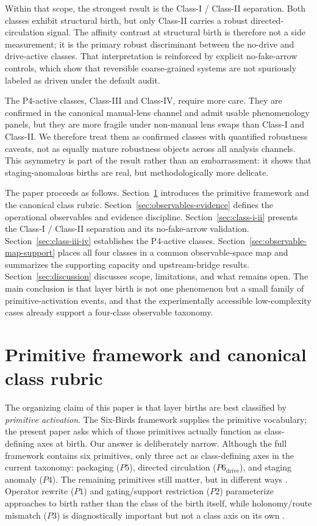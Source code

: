 \documentclass[11pt]{article}
\begin{document}
Within that scope, the strongest result is the Class-I / Class-II separation. Both classes exhibit structural birth, but only Class-II carries a robust directed-circulation signal. The affinity contrast at structural birth is therefore not a side measurement; it is the primary robust discriminant between the no-drive and drive-active classes. That interpretation is reinforced by explicit no-fake-arrow controls, which show that reversible coarse-grained systems are not spuriously labeled as driven under the default audit.

The P4-active classes, Class-III and Class-IV, require more care. They are confirmed in the canonical manual-lens channel and admit usable phenomenology panels, but they are more fragile under non-manual lens swaps than Class-I and Class-II. We therefore treat them as confirmed classes with quantified robustness caveats, not as equally mature robustness objects across all analysis channels. This asymmetry is part of the result rather than an embarrassment: it shows that staging-anomalous births are real, but methodologically more delicate.

The paper proceeds as follows. Section~\ref{sec:primitives-rubric} introduces the primitive framework and the canonical class rubric. Section~\ref{sec:observables-evidence} defines the operational observables and evidence discipline. Section~\ref{sec:class-i-ii} presents the Class-I / Class-II separation and its no-fake-arrow validation. Section~\ref{sec:class-iii-iv} establishes the P4-active classes. Section~\ref{sec:observable-map-support} places all four classes in a common observable-space map and summarizes the supporting capacity and upstream-bridge results. Section~\ref{sec:discussion} discusses scope, limitations, and what remains open. The main conclusion is that layer birth is not one phenomenon but a small family of primitive-activation events, and that the experimentally accessible low-complexity cases already support a four-class observable taxonomy.
 \section{Primitive framework and canonical class rubric}
\label{sec:primitives-rubric}

The organizing claim of this paper is that layer births are best classified by \emph{primitive activation}. The Six-Birds framework supplies the primitive vocabulary; the present paper asks which of those primitives actually function as class-defining axes at birth. Our answer is deliberately narrow. Although the full framework contains six primitives, only three act as class-defining axes in the current taxonomy: packaging ($P5$), directed circulation ($P6_{\mathrm{drive}}$), and staging anomaly ($P4$). The remaining primitives still matter, but in different ways \cite{miller_primitives_2018}. Operator rewrite ($P1$) and gating/support restriction ($P2$) parameterize approaches to birth rather than the class of the birth itself, while holonomy/route mismatch ($P3$) is diagnostically important but not a class axis on its own \cite{sixbirds_foundations,sixbirds_protocol_trap}.
\end{document}
